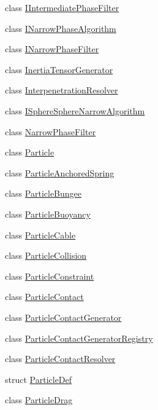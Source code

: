 \begin{DoxyCompactItemize}
\item 
class \mbox{\hyperlink{classr3_1_1_i_intermediate_phase_filter}{I\+Intermediate\+Phase\+Filter}}
\item 
class \mbox{\hyperlink{classr3_1_1_i_narrow_phase_algorithm}{I\+Narrow\+Phase\+Algorithm}}
\item 
class \mbox{\hyperlink{classr3_1_1_i_narrow_phase_filter}{I\+Narrow\+Phase\+Filter}}
\item 
class \mbox{\hyperlink{classr3_1_1_inertia_tensor_generator}{Inertia\+Tensor\+Generator}}
\item 
class \mbox{\hyperlink{classr3_1_1_interpenetration_resolver}{Interpenetration\+Resolver}}
\item 
class \mbox{\hyperlink{classr3_1_1_i_sphere_sphere_narrow_algorithm}{I\+Sphere\+Sphere\+Narrow\+Algorithm}}
\item 
class \mbox{\hyperlink{classr3_1_1_narrow_phase_filter}{Narrow\+Phase\+Filter}}
\item 
class \mbox{\hyperlink{classr3_1_1_particle}{Particle}}
\item 
class \mbox{\hyperlink{classr3_1_1_particle_anchored_spring}{Particle\+Anchored\+Spring}}
\item 
class \mbox{\hyperlink{classr3_1_1_particle_bungee}{Particle\+Bungee}}
\item 
class \mbox{\hyperlink{classr3_1_1_particle_buoyancy}{Particle\+Buoyancy}}
\item 
class \mbox{\hyperlink{classr3_1_1_particle_cable}{Particle\+Cable}}
\item 
class \mbox{\hyperlink{classr3_1_1_particle_collision}{Particle\+Collision}}
\item 
class \mbox{\hyperlink{classr3_1_1_particle_constraint}{Particle\+Constraint}}
\item 
class \mbox{\hyperlink{classr3_1_1_particle_contact}{Particle\+Contact}}
\item 
class \mbox{\hyperlink{classr3_1_1_particle_contact_generator}{Particle\+Contact\+Generator}}
\item 
class \mbox{\hyperlink{classr3_1_1_particle_contact_generator_registry}{Particle\+Contact\+Generator\+Registry}}
\item 
class \mbox{\hyperlink{classr3_1_1_particle_contact_resolver}{Particle\+Contact\+Resolver}}
\item 
struct \mbox{\hyperlink{structr3_1_1_particle_def}{Particle\+Def}}
\item 
class \mbox{\hyperlink{classr3_1_1_particle_drag}{Particle\+Drag}}

\end{DoxyCompactItemize}
